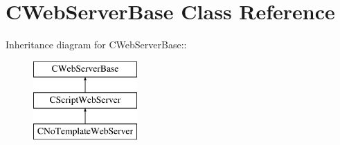 \section{CWebServerBase Class Reference}
\label{classCWebServerBase}
Inheritance diagram for CWebServerBase::\begin{figure}[H]
\begin{center}
\leavevmode
\includegraphics[height=3cm]{classCWebServerBase}
\end{center}
\end{figure}
